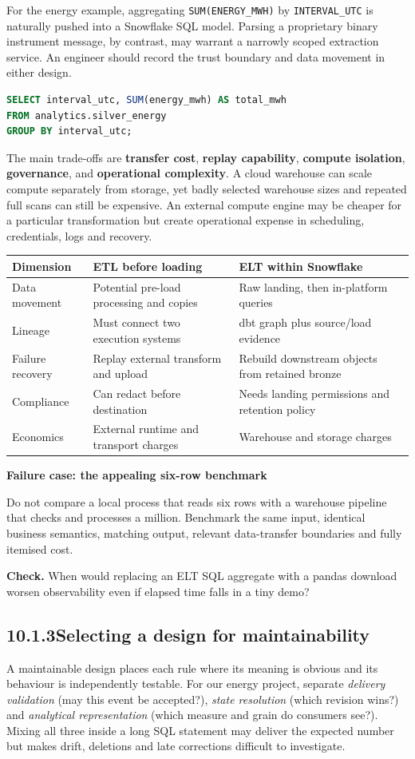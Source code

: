 \documentclass[11pt,twoside]{article}
\newcommand{\topic}[2]{\subsection*{#1\quad #2}}
\begin{document}
For the energy example, aggregating \texttt{SUM(ENERGY\_MWH)} by \texttt{INTERVAL\_UTC} is naturally pushed into a Snowflake SQL model. Parsing a proprietary binary instrument message, by contrast, may warrant a narrowly scoped extraction service. An engineer should record the trust boundary and data movement in either design.
\begin{lstlisting}[language=SQL,caption={Warehouse-side gold calculation; assumes accepted silver rows.}]
SELECT interval_utc, SUM(energy_mwh) AS total_mwh
FROM analytics.silver_energy
GROUP BY interval_utc;
\end{lstlisting}
The main trade-offs are \textbf{transfer cost}, \textbf{replay capability}, \textbf{compute isolation}, \textbf{governance}, and \textbf{operational complexity}. A cloud warehouse can scale compute separately from storage, yet badly selected warehouse sizes and repeated full scans can still be expensive. An external compute engine may be cheaper for a particular transformation but create operational expense in scheduling, credentials, logs and recovery.
\begin{center}\renewcommand{\arraystretch}{1.12}\begin{tabularx}{\linewidth}{@{}p{31mm}XX@{}}\toprule
\textbf{Dimension}&\textbf{ETL before loading}&\textbf{ELT within Snowflake}\\\midrule
Data movement&Potential pre-load processing and copies&Raw landing, then in-platform queries\\
Lineage&Must connect two execution systems&dbt graph plus source/load evidence\\
Failure recovery&Replay external transform and upload&Rebuild downstream objects from retained bronze\\
Compliance&Can redact before destination&Needs landing permissions and retention policy\\
Economics&External runtime and transport charges&Warehouse and storage charges\\\bottomrule\end{tabularx}\end{center}
\begin{insight}\textbf{Failure case: the appealing six-row benchmark}\par
Do not compare a local process that reads six rows with a warehouse pipeline that checks and processes a million. Benchmark the same input, identical business semantics, matching output, relevant data-transfer boundaries and fully itemised cost.\end{insight}
\textbf{Check.} When would replacing an ELT SQL aggregate with a pandas download worsen observability even if elapsed time falls in a tiny demo?
\newpage
\topic{10.1.3}{Selecting a design for maintainability}
A maintainable design places each rule where its meaning is obvious and its behaviour is independently testable. For our energy project, separate \emph{delivery validation} (may this event be accepted?), \emph{state resolution} (which revision wins?) and \emph{analytical representation} (which measure and grain do consumers see?). Mixing all three inside a long SQL statement may deliver the expected number but makes drift, deletions and late corrections difficult to investigate.
\end{document}
